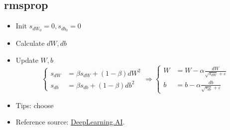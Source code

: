 \subsection{\ac{rmsprop}}
\begin{itemize}
	\item Init $s_{dW_0} = 0, s_{db_0}=0$
	\item Calculate $dW, db$
	\item Update $W, b$
	\begin{equation}
		\begin{cases}
			s_{dW} &= \beta s_{dW} + (1-\beta)dW^2 \\
			s_{db} &= \beta s_{db} + (1-\beta)db^2
		\end{cases}
		\Rightarrow
		\begin{cases}
			W &= W - \alpha \frac{dW}{\sqrt{s_{dW}} + \varepsilon}\\
			b &= b - \alpha \frac{db}{\sqrt{s_{db}} + \varepsilon}
		\end{cases}
	\end{equation}
	\item Tips: choose 
	\item Reference source: \href{https://youtu.be/_e-LFe_igno}{DeepLearning.AI}.
\end{itemize}

